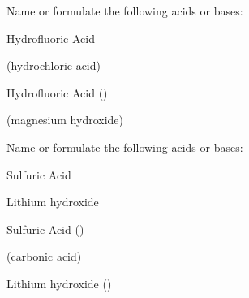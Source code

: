 \documentclass[main.tex]{subfiles}
\begin{document}
\begin{multicols*}{2}
\begin{question}[ID=\the\value{numA}]
Name or formulate the following acids or bases:
\begin{inparaenum}[(a)]
\item {}			%
\item Hydrofluoric Acid	%
\item {}		%
\end{inparaenum}
\end{question}
\begin{solution}
\begin{inparaenum}[(a)]
\item {}			(hydrochloric acid)
\item Hydrofluoric Acid	()
\item {}		(magnesium hydroxide)
 \end{inparaenum}\hspace{0.1cm}\end{solution}
\begin{question}[ID=\the\value{numA}]
Name or formulate the following acids or bases:
\begin{inparaenum}[(a)]
\item Sulfuric Acid		%
\item {}		%
\item Lithium hydroxide		%
\end{inparaenum}
\end{question}
\begin{solution}
\begin{inparaenum}[(a)]
\item Sulfuric Acid		()
\item {}		(carbonic acid)
\item Lithium hydroxide	()
 \end{inparaenum}\hspace{0.1cm}\end{solution}



\end{multicols*}
\end{document}
